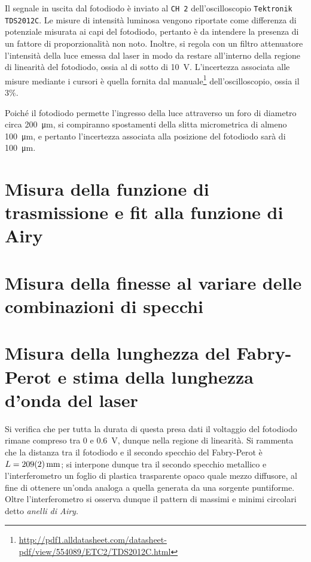 \documentclass[10pt,oneside,a4paper]{article}
\begin{document}
\begin{multicols}{2}
Il segnale in uscita dal fotodiodo è inviato al \texttt{CH 2} dell'oscilloscopio \texttt{Tektronik TDS2012C}. Le misure di intensità luminosa vengono riportate come differenza di potenziale misurata ai capi del fotodiodo, pertanto è da intendere la presenza di un fattore di proporzionalità non noto. Inoltre, si regola con un filtro attenuatore l'intensità della luce emessa dal laser in modo da restare all'interno della regione di linearità del fotodiodo, ossia al di sotto di \SI{10}{V}. L'incertezza associata alle misure mediante i cursori è quella fornita dal manuale\footnote{\url{http://pdf1.alldatasheet.com/datasheet-pdf/view/554089/ETC2/TDS2012C.html}} dell'oscilloscopio, ossia il $3\%$.

Poiché il fotodiodo permette l'ingresso della luce attraverso un foro di diametro circa \SI{200}{\micro m}, si compiranno spostamenti della slitta micrometrica di almeno \SI{100}{\micro m}, e pertanto l'incertezza associata alla posizione del fotodiodo sarà di \SI{100}{\micro m}.

\section{Misura della funzione di trasmissione e fit alla funzione di Airy}


\section{Misura della finesse al variare delle combinazioni di specchi}



\section{Misura della lunghezza del Fabry-Perot e stima della lunghezza d'onda del laser}
Si verifica che per tutta la durata di questa presa dati il voltaggio del fotodiodo rimane compreso tra \SI{0}{} e \SI{0.6}{V}, dunque nella regione di linearità. Si rammenta che la distanza tra il fotodiodo e il secondo specchio del Fabry-Perot è $L=\SI{209 \pm 2}{mm}$; si interpone dunque tra il secondo specchio metallico e l'interferometro un foglio di plastica trasparente opaco quale mezzo diffusore, al fine di ottenere un'onda analoga a quella generata da una sorgente puntiforme. Oltre l'interferometro si osserva dunque il pattern di massimi e minimi circolari detto \emph{anelli di Airy}.


\end{multicols}
\end{document}
